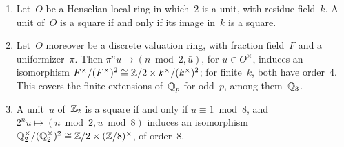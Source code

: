 \begin{lemma}
\label{lem:ds-padic-squares}
\leanok
{}
\begin{enumerate}
  \item Let~$O$ be a Henselian local ring in which~$2$ is a unit, with residue field~$k$. A unit
    of~$O$ is a square if and only if its image in~$k$ is a square.
  \item Let~$O$ moreover be a discrete valuation ring, with fraction field~$F$ and a
    uniformizer~$\pi$. Then $\pi^n u \mapsto (n \bmod 2, \bar u)$, for $u \in O^\times$, induces
    an isomorphism $F^\times/(F^\times)^2 \cong \mathbb{Z}/2 \times k^\times/(k^\times)^2$; for
    finite~$k$, both have order~$4$. This covers the finite extensions of~$\mathbb{Q}_p$ for odd~$p$,
    among them~$\mathbb{Q}_3$.
  \item A unit~$u$ of~$\mathbb{Z}_2$ is a square if and only if $u \equiv 1 \bmod 8$, and
    $2^n u \mapsto (n \bmod 2, u \bmod 8)$ induces an isomorphism
    $\mathbb{Q}_2^\times/(\mathbb{Q}_2^\times)^2 \cong \mathbb{Z}/2 \times (\mathbb{Z}/8)^\times$, of order~$8$.
\end{enumerate}
\end{lemma}

